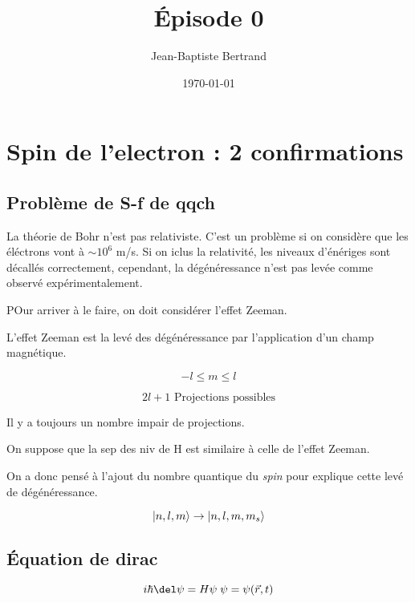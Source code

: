 \documentclass{article}
\title{Épisode 0}
\author{Jean-Baptiste Bertrand}
\date{\today}
\begin{document}
\maketitle

\section{Spin de l'electron : 2 confirmations}

\subsection*{Problème de S-f de qqch}

La théorie de Bohr n'est pas relativiste. C'est un problème si on considère que les éléctrons vont à $\sim 10^6$ m/s. Si on iclus la relativité, les niveaux d'énériges sont décallés correctement, cependant, la dégénéressance n'est pas levée comme observé expérimentalement.

POur arriver à le faire, on doit considérer l'effet Zeeman.

L'effet Zeeman est la levé des dégénéressance par l'application d'un champ magnétique.


$$-l \leq m \leq l $$

$$2l + 1 \text{ Projections possibles}$$

Il y a toujours un nombre impair de projections.





On suppose que la sep des niv de H est similaire à celle de l'effet Zeeman.

On a donc pensé à l'ajout du nombre quantique du \textit{spin} pour explique cette levé de dégénéressance.


$$\ket{n,l,m} \to \ket{n,l,m,m_s}$$

\subsection*{Équation de dirac}

$$i\hbar \del \psi = H\psi \; \psi = \psi(\vec r, t)$$
\end{document}
